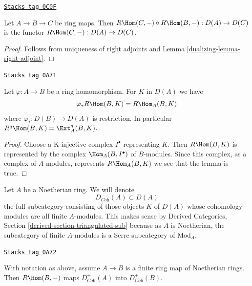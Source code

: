 \begin{lemma}
\label{dualizing-lemma-composition-right-adjoints}
\href{https://stacks.math.columbia.edu/tag/0C0F}{\texttt{Stacks tag 0C0F}}

Let $A \to B \to C$ be ring maps. Then
$R\Hom(C, -) \circ R\Hom(B, -) : D(A) \to D(C)$
is the functor $R\Hom(C, -) : D(A) \to D(C)$.
\end{lemma}

\begin{proof}

Follows from uniqueness of right adjoints and Lemma \ref{dualizing-lemma-right-adjoint}.
\end{proof}

\begin{lemma}
\label{dualizing-lemma-RHom-ext}
\href{https://stacks.math.columbia.edu/tag/0A71}{\texttt{Stacks tag 0A71}}

Let $\varphi : A \to B$ be a ring homomorphism. For $K$ in $D(A)$ we have
$$
\varphi_*R\Hom(B, K) = R\Hom_A(B, K)
$$
where $\varphi_* : D(B) \to D(A)$ is restriction. In particular
$R^q\Hom(B, K) = \Ext_A^q(B, K)$.
\end{lemma}

\begin{proof}
Choose a K-injective complex $I^\bullet$ representing $K$.
Then $R\Hom(B, K)$ is represented by the complex $\Hom_A(B, I^\bullet)$
of $B$-modules. Since this complex, as a complex of $A$-modules,
represents $R\Hom_A(B, K)$ we see that the lemma is true.
\end{proof}

Let $A$ be a Noetherian ring. We will denote
$$
D_{\textit{Coh}}(A) \subset D(A)
$$
the full subcategory consisting of those objects $K$ of $D(A)$
whose cohomology modules are all finite $A$-modules. This makes sense
by Derived Categories, Section \ref{derived-section-triangulated-sub}
because as $A$ is Noetherian, the subcategory of finite $A$-modules
is a Serre subcategory of $\text{Mod}_A$.

\begin{lemma}
\label{dualizing-lemma-exact-support-coherent}
\href{https://stacks.math.columbia.edu/tag/0A72}{\texttt{Stacks tag 0A72}}

With notation as above, assume $A \to B$ is a finite ring map of
Noetherian rings. Then $R\Hom(B, -)$ maps
$D^+_{\textit{Coh}}(A)$ into $D^+_{\textit{Coh}}(B)$.
\end{lemma}

